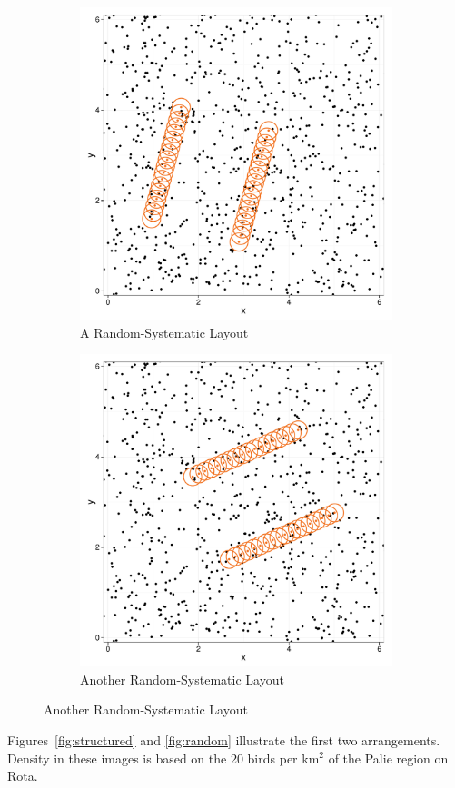 \documentclass[12pt]{article}
\begin{document}
\begin{figure}
	\begin{subfigure}[b]{0.45\textwidth}
		\includegraphics[width=\textwidth]{../images/layout_rand-sys-4.pdf}
		\caption{A Random-Systematic Layout}
		\label{fig:transect1}
	\end{subfigure}
	\begin{subfigure}[b]{0.45\textwidth}
		\includegraphics[width=\textwidth]{../images/layout_rand-sys-6.pdf}
		\caption{Another Random-Systematic Layout}
		\label{fig:transect2}
	\end{subfigure}
	\label{fig:layouts}
\end{figure}
Figures~\ref{fig:structured} and \ref{fig:random} illustrate the first two arrangements. Density in these images is based on the 20 birds per km$^2$ of the Palie region on Rota. 
\end{document}

